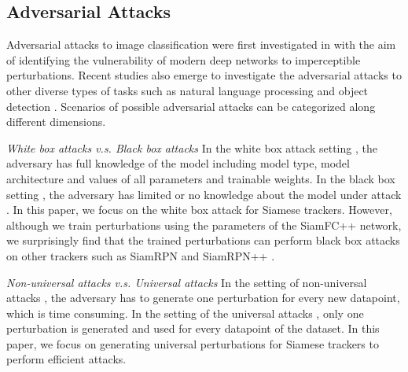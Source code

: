 \documentclass[journal]{IEEEtran}
\begin{document}
\subsection{Adversarial Attacks}

Adversarial attacks \cite{9169672} to image classification were first investigated in \cite{intriguing} with the aim of identifying the vulnerability of modern deep networks to imperceptible perturbations. 
Recent studies also emerge to investigate the adversarial attacks to other diverse types of tasks such as natural language processing \cite{generating,zhang2020adversarial,morris2020textattack,jin2020bert} and object detection \cite{wei2019transferable}.
Scenarios of possible adversarial attacks can be categorized along different dimensions.

\textit{White box attacks v.s. Black box attacks} In the white box attack setting \cite{meng2019white}, the adversary has full knowledge of the model including model type, model architecture and values of all parameters and trainable weights. In the black box setting \cite{cheng2018query,li2019nattack,papernot2017practical,li2020projection}, the adversary has limited or no knowledge about the model under attack \cite{kurakin2018adversarial}. In this paper, we focus on the white box attack for Siamese trackers. However, although we train perturbations using the parameters of the SiamFC++ \cite{SiamFC++} network, we surprisingly find that the trained perturbations can perform black box attacks on other trackers such as SiamRPN \cite{SiamRPN} and SiamRPN++ \cite{SiamRPN++}.

\textit{Non-universal attacks v.s. Universal attacks} In the setting of non-universal attacks \cite{dai2018adversarial,li2018second,lin2017tactics}, the adversary has to generate one perturbation for every new datapoint, which is time consuming. In the setting of the universal attacks \cite{khrulkov2018art,mopuri2018nag,zhang2020understanding,mopuri2018generalizable,chen2018shapeshifter}, only one perturbation is generated and used for every datapoint of the dataset. In this paper, we focus on generating universal perturbations for Siamese trackers to perform efficient attacks.

\end{document}
